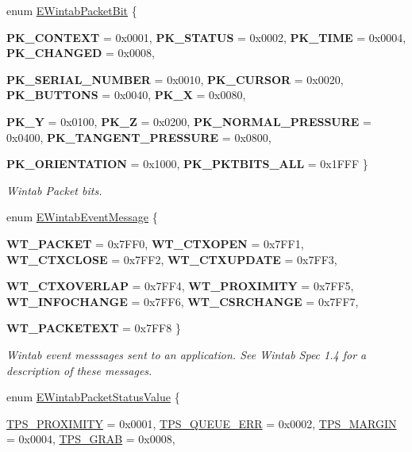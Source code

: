 \begin{DoxyCompactItemize}
enum \hyperlink{namespace_wintab_d_n_a0244b62cdae8bfd39a52f0656ae7d184}{EWintabPacketBit} \{ \par
{\bfseries PK\_\-CONTEXT} =  0x0001, 
{\bfseries PK\_\-STATUS} =  0x0002, 
{\bfseries PK\_\-TIME} =  0x0004, 
{\bfseries PK\_\-CHANGED} =  0x0008, 
\par
{\bfseries PK\_\-SERIAL\_\-NUMBER} =  0x0010, 
{\bfseries PK\_\-CURSOR} =  0x0020, 
{\bfseries PK\_\-BUTTONS} =  0x0040, 
{\bfseries PK\_\-X} =  0x0080, 
\par
{\bfseries PK\_\-Y} =  0x0100, 
{\bfseries PK\_\-Z} =  0x0200, 
{\bfseries PK\_\-NORMAL\_\-PRESSURE} =  0x0400, 
{\bfseries PK\_\-TANGENT\_\-PRESSURE} =  0x0800, 
\par
{\bfseries PK\_\-ORIENTATION} =  0x1000, 
{\bfseries PK\_\-PKTBITS\_\-ALL} =  0x1FFF
 \}
\begin{DoxyCompactList}\small\item\em Wintab Packet bits. \item\end{DoxyCompactList}\item 
enum \hyperlink{namespace_wintab_d_n_a4b98724153acf19dc7b44dc911e7fd0d}{EWintabEventMessage} \{ \par
{\bfseries WT\_\-PACKET} =  0x7FF0, 
{\bfseries WT\_\-CTXOPEN} =  0x7FF1, 
{\bfseries WT\_\-CTXCLOSE} =  0x7FF2, 
{\bfseries WT\_\-CTXUPDATE} =  0x7FF3, 
\par
{\bfseries WT\_\-CTXOVERLAP} =  0x7FF4, 
{\bfseries WT\_\-PROXIMITY} =  0x7FF5, 
{\bfseries WT\_\-INFOCHANGE} =  0x7FF6, 
{\bfseries WT\_\-CSRCHANGE} =  0x7FF7, 
\par
{\bfseries WT\_\-PACKETEXT} =  0x7FF8
 \}
\begin{DoxyCompactList}\small\item\em Wintab event messsages sent to an application. See Wintab Spec 1.4 for a description of these messages. \item\end{DoxyCompactList}\item 
enum \hyperlink{namespace_wintab_d_n_afe14d17b83fb34685a298d857c203cac}{EWintabPacketStatusValue} \{ \par
\hyperlink{namespace_wintab_d_n_afe14d17b83fb34685a298d857c203cac}{TPS\_\-PROXIMITY} =  0x0001, 
\hyperlink{namespace_wintab_d_n_afe14d17b83fb34685a298d857c203cac}{TPS\_\-QUEUE\_\-ERR} =  0x0002, 
\hyperlink{namespace_wintab_d_n_afe14d17b83fb34685a298d857c203cac}{TPS\_\-MARGIN} =  0x0004, 
\hyperlink{namespace_wintab_d_n_afe14d17b83fb34685a298d857c203cac}{TPS\_\-GRAB} =  0x0008, 

\end{DoxyCompactItemize}
